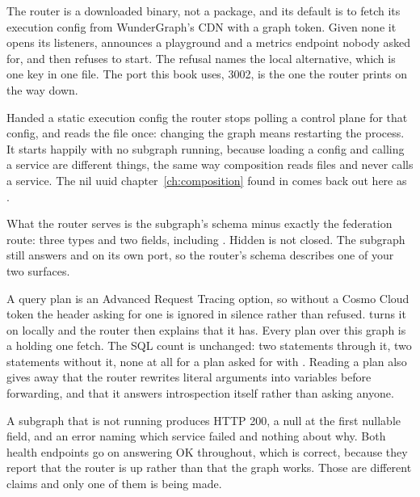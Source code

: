 \begin{chaptersummary}
  \item The router is a downloaded binary, not a package, and its default is to
        fetch its execution config from WunderGraph's CDN with a graph token.
        Given none it opens its listeners, announces a playground and a metrics
        endpoint nobody asked for, and then refuses to start. The refusal names
        the local alternative, which is one key in one file. The port this book
        uses, 3002, is the one the router prints on the way down.
  \item Handed a static execution config the router stops polling a control
        plane for that config, and
        reads the file once: changing the graph means restarting the process. It
        starts happily with no subgraph running, because loading a config and
        calling a service are different things, the same way composition reads
        files and never calls a service. The nil uuid
        chapter~\ref{ch:composition} found in  comes back out
        here as .
  \item What the router serves is the subgraph's schema minus exactly the
        federation route: three types and two  fields, including
        . Hidden is not closed. The subgraph still answers
         and  on its own port, so the router's
        schema describes one of your two surfaces.
  \item A query plan is an Advanced Request Tracing option, so without a Cosmo
        Cloud token the header asking for one is ignored in silence rather than
        refused.  turns it on locally and the router then
        explains that it has. Every plan over this graph is a 
        holding one  fetch. The SQL count is unchanged:
        two statements through it, two statements without it, none at all for a
        plan asked for with . Reading a plan also gives
        away that the router rewrites literal arguments into variables before
        forwarding, and that it answers introspection itself rather than asking
        anyone.
  \item A subgraph that is not running produces HTTP 200, a null at the first
        nullable field, and an error naming which service failed and nothing
        about why. Both health endpoints go on answering OK throughout, which is
        correct, because they report that the router is up rather than that the
        graph works. Those are different claims and only one of them is being
        made.
\end{chaptersummary}
